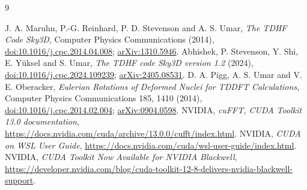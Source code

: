 \documentclass[11pt,a4paper]{article}
\begin{document}
\clearpage
\begin{thebibliography}{9}
 J. A. Maruhn, P.-G. Reinhard, P. D. Stevenson and A. S. Umar,
\emph{The TDHF Code Sky3D}, Computer Physics Communications (2014),
\href{https://doi.org/10.1016/j.cpc.2014.04.008}{doi:10.1016/j.cpc.2014.04.008};
\href{https://arxiv.org/abs/1310.5946}{arXiv:1310.5946}.
 Abhishek, P. Stevenson, Y. Shi, E. Y\"uksel and S. Umar,
\emph{The TDHF code Sky3D version 1.2} (2024),
\href{https://doi.org/10.1016/j.cpc.2024.109239}{doi:10.1016/j.cpc.2024.109239};
\href{https://arxiv.org/abs/2405.08531}{arXiv:2405.08531}.
 D. A. Pigg, A. S. Umar and V. E. Oberacker,
\emph{Eulerian Rotations of Deformed Nuclei for TDDFT Calculations},
Computer Physics Communications 185, 1410 (2014),
\href{https://doi.org/10.1016/j.cpc.2014.02.004}{doi:10.1016/j.cpc.2014.02.004};
\href{https://arxiv.org/abs/0904.0598}{arXiv:0904.0598}.
 NVIDIA, \emph{cuFFT, CUDA Toolkit 13.0 documentation},
\url{https://docs.nvidia.com/cuda/archive/13.0.0/cufft/index.html}.
 NVIDIA, \emph{CUDA on WSL User Guide},
\url{https://docs.nvidia.com/cuda/wsl-user-guide/index.html}.
 NVIDIA, \emph{CUDA Toolkit Now Available for NVIDIA Blackwell},
\url{https://developer.nvidia.com/blog/cuda-toolkit-12-8-delivers-nvidia-blackwell-support}.
\end{thebibliography}
\end{document}

